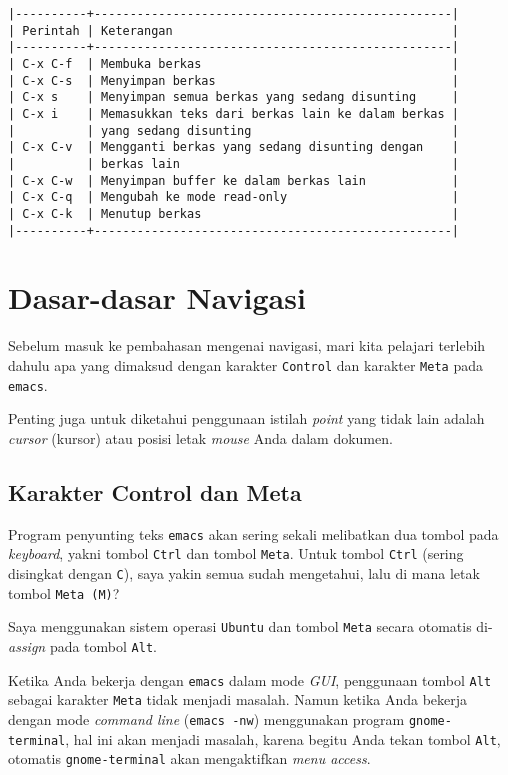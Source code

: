 \documentclass{article}
\begin{document}
\begin{verbatim}
|----------+--------------------------------------------------|
| Perintah | Keterangan                                       |
|----------+--------------------------------------------------|
| C-x C-f  | Membuka berkas                                   |
| C-x C-s  | Menyimpan berkas                                 |
| C-x s    | Menyimpan semua berkas yang sedang disunting     |
| C-x i    | Memasukkan teks dari berkas lain ke dalam berkas |
|          | yang sedang disunting                            |
| C-x C-v  | Mengganti berkas yang sedang disunting dengan    |
|          | berkas lain                                      |
| C-x C-w  | Menyimpan buffer ke dalam berkas lain            |
| C-x C-q  | Mengubah ke mode read-only                       |
| C-x C-k  | Menutup berkas                                   |
|----------+--------------------------------------------------|
\end{verbatim}

\section{Dasar-dasar Navigasi}
Sebelum masuk ke pembahasan mengenai navigasi, mari kita
pelajari terlebih dahulu apa yang dimaksud dengan karakter
\verb=Control= dan karakter \verb=Meta= pada \verb=emacs=.

Penting juga untuk diketahui penggunaan istilah \emph{point} yang tidak 
lain adalah \emph{cursor} (kursor) atau posisi letak \emph{mouse} Anda dalam
dokumen.

\subsection{Karakter Control dan Meta}
Program penyunting teks \verb=emacs= akan sering sekali
melibatkan dua tombol pada \emph{keyboard}, yakni tombol
\verb=Ctrl= dan tombol \verb=Meta=. Untuk tombol \verb=Ctrl=
(sering disingkat dengan \verb=C=), saya yakin semua sudah
mengetahui, lalu di mana letak tombol \verb=Meta (M)=?

Saya menggunakan sistem operasi \verb=Ubuntu= dan tombol
\verb=Meta= secara otomatis di-\emph{assign} pada tombol
\verb=Alt=.

Ketika Anda bekerja dengan \verb=emacs= dalam mode \emph{GUI},
penggunaan tombol \verb=Alt= sebagai karakter \verb=Meta= 
tidak menjadi masalah. Namun ketika Anda bekerja dengan mode
\emph{command line} (\verb=emacs -nw=) menggunakan program 
\verb=gnome-terminal=, hal ini akan menjadi masalah, karena 
begitu Anda tekan tombol \verb=Alt=, 
otomatis \verb=gnome-terminal= akan mengaktifkan \emph{menu access}.
\end{document}
